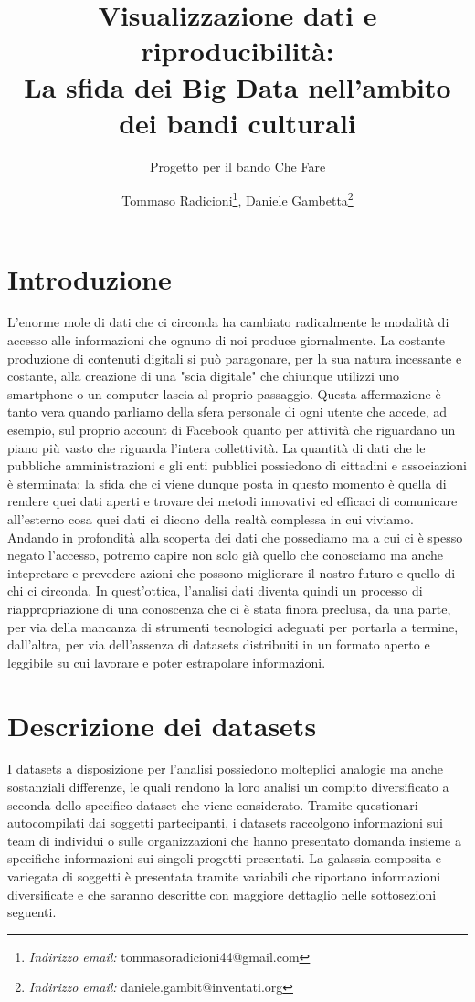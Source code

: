 \documentclass[a4paper,10pt]{scrartcl}
\title{Visualizzazione dati e riproducibilità:\\
La sfida dei Big Data nell'ambito dei bandi culturali
\vspace{0.2cm}}
\subtitle{Progetto per il bando Che Fare}
\author{Tommaso Radicioni\thanks{\textit{Indirizzo email:} tommasoradicioni44@gmail.com}, Daniele Gambetta\thanks{\textit{Indirizzo email:} daniele.gambit@inventati.org}}
\begin{document}
\maketitle
\section{Introduzione}
L'enorme mole di dati che ci circonda ha cambiato radicalmente le modalità di accesso alle informazioni che ognuno di noi produce giornalmente. La costante produzione di contenuti digitali si può paragonare, per la sua natura incessante e costante, alla creazione di una "scia digitale" che chiunque utilizzi uno smartphone o un computer lascia al proprio passaggio. Questa affermazione è tanto vera quando parliamo della sfera personale di ogni utente che accede, ad esempio, sul proprio account di Facebook quanto per attività che riguardano un piano più vasto che riguarda l'intera collettività. La quantità di dati che le pubbliche amministrazioni e gli enti pubblici possiedono di cittadini e associazioni è sterminata: la sfida che ci viene dunque posta in questo momento è quella di rendere quei dati aperti e trovare dei metodi innovativi ed efficaci di comunicare all'esterno cosa quei dati ci dicono della realtà complessa in cui viviamo. Andando in profondità alla scoperta dei dati che possediamo ma a cui ci è spesso negato l'accesso, potremo capire non solo già quello che conosciamo ma anche intepretare e prevedere azioni che possono migliorare il nostro futuro e quello di chi ci circonda. In quest'ottica, l'analisi dati diventa quindi un processo di riappropriazione di una conoscenza che ci è stata finora preclusa, da una parte, per via della mancanza di strumenti tecnologici adeguati per portarla a termine, dall'altra, per via dell'assenza di datasets distribuiti in un formato aperto e leggibile su cui lavorare e poter estrapolare informazioni.  

\section{Descrizione dei datasets}
I datasets a disposizione per l'analisi possiedono molteplici analogie ma anche sostanziali differenze, le quali rendono la loro analisi un compito diversificato a seconda dello specifico dataset che viene considerato. Tramite questionari autocompilati dai soggetti partecipanti, i datasets raccolgono informazioni sui team di individui o sulle organizzazioni che hanno presentato domanda insieme a specifiche informazioni sui singoli progetti presentati. La galassia composita e variegata di soggetti è presentata tramite variabili che riportano informazioni diversificate e che saranno descritte con maggiore dettaglio nelle sottosezioni seguenti.
\end{document}
